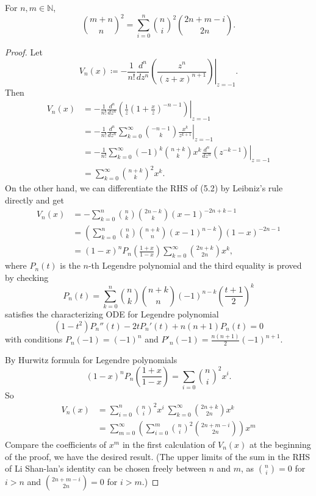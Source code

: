 \documentclass[10pt,a4paper]{amsart}
\newcommand{\N}{\mathbb{N}}
\begin{document}
\begin{theo}\label{Li} For $n,m\in\N$,
$$
    \binom{m+n}{n}^2=\sum_{i=0}^{n}\binom{n}{i}^2\binom{2n+m-i}{2n}.
$$
\end{theo}

\begin{proof}
    Let \begin{equation}
           V_n(x)\coloneqq\left.-\frac{1}{n!}\frac{d^n}{dz^{n}}\left(\frac{z^n}{(z+x)^{n+1}}\right)\right|_{z=-1}. 
    \end{equation}
    Then 
    \begin{align*}
        V_n(x)& =-\frac{1}{n!}\left.\frac{d^n}{dz^{n}}\left(\frac{1}{z}\left(1+\frac{x}{z}\right)^{-n-1}\right)\right|_{z=-1}\\
        &=-\frac{1}{n!}\left.\frac{d^n}{dz^{n}}\sum_{k=0}^\infty\binom{-n-1}{k}\frac{x^k}{z^{k+1}}\right|_{z=-1}\\
        &=-\frac{1}{n!}\sum_{k=0}^{\infty}(-1)^k\binom{n+k}{k}x^k\left.\frac{d^n}{dz^{n}}\left(z^{-k-1}\right)\right|_{z=-1}\\
        &=\sum_{k=0}^\infty\binom{n+k}{k}^2x^k.
    \end{align*}
    On the other hand, we can differentiate the RHS of (5.2) by Leibniz's rule directly and get
    \begin{align*}
        V_n(x)& =-\sum_{k=0}^n\binom{n}{k}\binom{2n-k}{k}(x-1)^{-2n+k-1}\\
        & =\left(\sum_{k=0}^n\binom{n}{k}\binom{n+k}{n}(x-1)^{n-k}\right)(1-x)^{-2n-1}\\
        & =(1-x)^n P_n\left(\frac{1+x}{1-x}\right)\sum_{k=0}^\infty\binom{2n+k}{2n}x^k,
    \end{align*}
where $P_n(t)$ is the $n$-th Legendre polynomial and the third equality is proved by checking $$P_n(t)=\sum_{k=0}^n\binom{n}{k}\binom{n+k}{n}(-1)^{n-k}\left(\frac{t+1}{2}\right)^k$$ satisfies the characterizing ODE for Legendre polynomial $$(1-t^2)P_n''(t)-2tP_n'(t)+n(n+1)P_n(t)=0$$ with conditions $P_n(-1)=(-1)^n$ and $P'_n(-1)=\frac{n(n+1)}{2}(-1)^{n+1}.$

By Hurwitz formula for Legendre polynomials
$$
    (1-x)^nP_n\left(\frac{1+x}{1-x}\right)=\sum_{i=0}\binom{n}{i}^2x^i.
$$
So 
\begin{align*}
    V_n(x)& =\sum_{i=0}^{n}\binom{n}{i}^2x^i\ \sum_{k=0}^\infty\binom{2n+k}{2n}x^k \\
    & = \sum_{m=0}^\infty\left(\sum_{i=0}^m\binom{n}{i}^2\binom{2n+m-i}{2n}\right)x^m
\end{align*}
Compare the coefficients of $x^m$ in the first calculation of $V_n(x)$ at the beginning of the proof, we have the desired result. (The upper limits of the sum in the RHS of Li Shan-lan's  identity can be chosen freely between $n$ and $m$, as $\binom{n}{i}=0$ for $i>n$ and $\binom{2n+m-i}{2n}=0$ for $i>m$.)
\end{proof}
\end{document}

